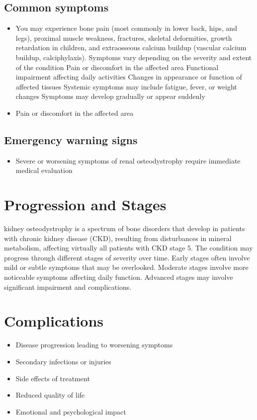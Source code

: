 \subsection{Common symptoms}
\begin{itemize}[noitemsep]
  \item You may experience bone pain (most commonly in lower back, hips, and legs), proximal muscle weakness, fractures, skeletal deformities, growth retardation in children, and extraosseous calcium buildup (vascular calcium buildup, calciphylaxis). Symptoms vary depending on the severity and extent of the condition Pain or discomfort in the affected area Functional impairment affecting daily activities Changes in appearance or function of affected tissues Systemic symptoms may include fatigue, fever, or weight changes Symptoms may develop gradually or appear suddenly
  \item Pain or discomfort in the affected area
  \end{itemize}

\subsection{Emergency warning signs}
\begin{itemize}[noitemsep]
  \item Severe or worsening symptoms of renal osteodystrophy require immediate medical evaluation
\end{itemize}
\section{Progression and Stages}
kidney osteodystrophy is a spectrum of bone disorders that develop in patients with chronic kidney disease (CKD), resulting from disturbances in mineral metabolism, affecting virtually all patients with CKD stage 5. The condition may progress through different stages of severity over time. Early stages often involve mild or subtle symptoms that may be overlooked. Moderate stages involve more noticeable symptoms affecting daily function. Advanced stages may involve significant impairment and complications.
\section{Complications}
\begin{itemize}[noitemsep]
  \item Disease progression leading to worsening symptoms
  \item Secondary infections or injuries
  \item Side effects of treatment
  \item Reduced quality of life
  \item Emotional and psychological impact
\end{itemize}
